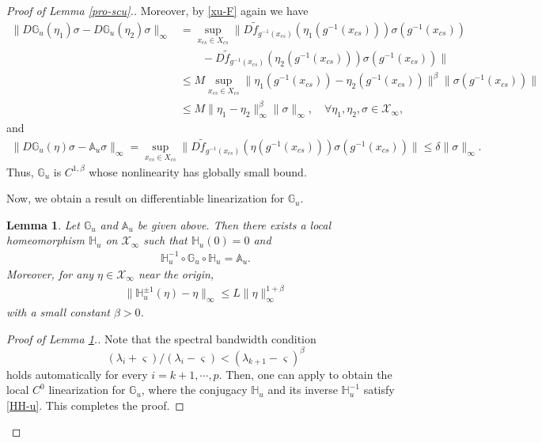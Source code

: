 \documentclass[reqno]{amsart}
\numberwithin{equation}{section}
\newtheorem{lemma}[theorem]{Lemma}
\begin{document}
\begin{proof}[Proof of Lemma {\rm \ref{pro-scu}}.]
Moreover, by \eqref{xu-F} again we have
\begin{align*}
\|D\mathbb{G}_u(\eta_1)\sigma-D\mathbb{G}_u(\eta_2)\sigma\|_\infty
&= \sup_{x_{cs}\in X_{cs}} \big\| D\tilde{f}_{g^{-1}(x_{cs})}(\eta_1(g^{-1}(x_{cs})))   \sigma(g^{-1}(x_{cs}))
\\
&\qquad   - D\tilde{f}_{g^{-1}(x_{cs})}(\eta_2(g^{-1}(x_{cs})))   \sigma(g^{-1}(x_{cs})) \big\|
\\
&\le M \sup_{x_{cs}\in X_{cs}} \| \eta_1(g^{-1}(x_{cs})) -\eta_2(g^{-1}(x_{cs}))\|^\beta \|\sigma(g^{-1}(x_{cs}))\|
\\
&\le M \|\eta_1-\eta_2\|_\infty^\beta \|\sigma\|_\infty, \quad \forall \eta_1,\eta_2, \sigma\in \mathcal{X}_\infty,
\end{align*}
and
\begin{align*}
\|D\mathbb{G}_u(\eta)\sigma-\mathbb{A}_u\sigma\|_\infty
= \sup_{x_{cs}\in X_{cs}}   \big\| D\tilde{f}_{g^{-1}(x_{cs})}(\eta(g^{-1}(x_{cs})))   \sigma(g^{-1}(x_{cs})) \big\|
\le \delta \|\sigma\|_\infty.
\end{align*}
Thus, $\mathbb{G}_u$ is $C^{1,\beta}$ whose nonlinearity has globally small bound.




Now, we obtain a result on differentiable linearization for $\mathbb{G}_u$.


\begin{lemma}\label{lem-u}
Let $\mathbb{G}_u$ and $\mathbb{A}_u$ be given above. Then there exists a local homeomorphism $\mathbb{H}_u$ on  $\mathcal{X}_\infty$  such that $\mathbb{H}_u(0)=0$  and
\begin{align}\label{us-conj}
\mathbb{H}_u^{-1} \circ \mathbb{G}_u \circ  \mathbb{H}_u= \mathbb{A}_u.
\end{align}
Moreover, for any $\eta\in \mathcal{X}_\infty$ near the origin,
\begin{align}\label{HH-u}
\|\mathbb{H}_u^{\pm 1}(\eta)-\eta\|_\infty \le L \|\eta\|_\infty^{1+
\beta}
\end{align}
with a small constant $\beta>0$.
\end{lemma}


\begin{proof}[Proof of Lemma {\rm \ref{lem-u}}.]
Note that the spectral bandwidth condition 
$$
(\lambda_i + \varsigma)/(\lambda_i-\varsigma)< (\lambda_{k+1}-\varsigma)^\beta
$$ 
holds automatically for every $i=k+1,\cdots,p$.
Then, one can apply \cite[Lemma 6.1]{ZLZ-TAMS} to obtain the local $C^0$ linearization for $\mathbb{G}_u$,
  where the conjugacy $\mathbb{H}_u$ and its inverse $\mathbb{H}_u^{-1}$ satisfy   \eqref{HH-u}.
This completes the proof.
\end{proof}


\end{proof}
\end{document}
